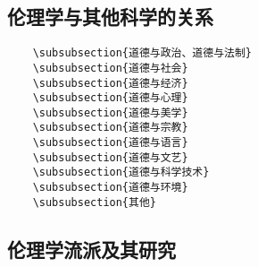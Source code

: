 \documentclass[UTF8]{../RepresentationUniverse}
\begin{document}
    \subsection{伦理学与其他科学的关系}
\begin{lstlisting}
    \subsubsection{道德与政治、道德与法制}
    \subsubsection{道德与社会}
    \subsubsection{道德与经济}
    \subsubsection{道德与心理}
    \subsubsection{道德与美学}
    \subsubsection{道德与宗教}
    \subsubsection{道德与语言}
    \subsubsection{道德与文艺}
    \subsubsection{道德与科学技术}
    \subsubsection{道德与环境}
    \subsubsection{其他}
\end{lstlisting}

    \subsection{伦理学流派及其研究}
\end{document}
